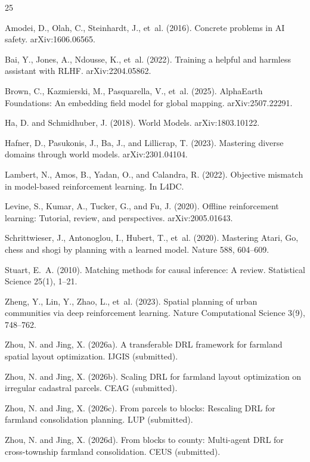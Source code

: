 \documentclass[11pt]{article}
\begin{document}
\begin{thebibliography}{25}

Amodei, D., Olah, C., Steinhardt, J., et~al. (2016).
Concrete problems in AI safety. arXiv:1606.06565.

Bai, Y., Jones, A., Ndousse, K., et~al. (2022).
Training a helpful and harmless assistant with RLHF. arXiv:2204.05862.

Brown, C., Kazmierski, M., Pasquarella, V., et~al. (2025).
AlphaEarth Foundations: An embedding field model for global mapping. arXiv:2507.22291.

Ha, D. and Schmidhuber, J. (2018).
World Models. arXiv:1803.10122.

Hafner, D., Pasukonis, J., Ba, J., and Lillicrap, T. (2023).
Mastering diverse domains through world models. arXiv:2301.04104.

Lambert, N., Amos, B., Yadan, O., and Calandra, R. (2022).
Objective mismatch in model-based reinforcement learning. In L4DC.

Levine, S., Kumar, A., Tucker, G., and Fu, J. (2020).
Offline reinforcement learning: Tutorial, review, and perspectives. arXiv:2005.01643.

Schrittwieser, J., Antonoglou, I., Hubert, T., et~al. (2020).
Mastering Atari, Go, chess and shogi by planning with a learned model. Nature 588, 604--609.

Stuart, E.~A. (2010).
Matching methods for causal inference: A review. Statistical Science 25(1), 1--21.

Zheng, Y., Lin, Y., Zhao, L., et~al. (2023).
Spatial planning of urban communities via deep reinforcement learning. Nature Computational Science 3(9), 748--762.

Zhou, N. and Jing, X. (2026a).
A transferable DRL framework for farmland spatial layout optimization. IJGIS (submitted).

Zhou, N. and Jing, X. (2026b).
Scaling DRL for farmland layout optimization on irregular cadastral parcels. CEAG (submitted).

Zhou, N. and Jing, X. (2026c).
From parcels to blocks: Rescaling DRL for farmland consolidation planning. LUP (submitted).

Zhou, N. and Jing, X. (2026d).
From blocks to county: Multi-agent DRL for cross-township farmland consolidation. CEUS (submitted).

\end{thebibliography}
\end{document}
